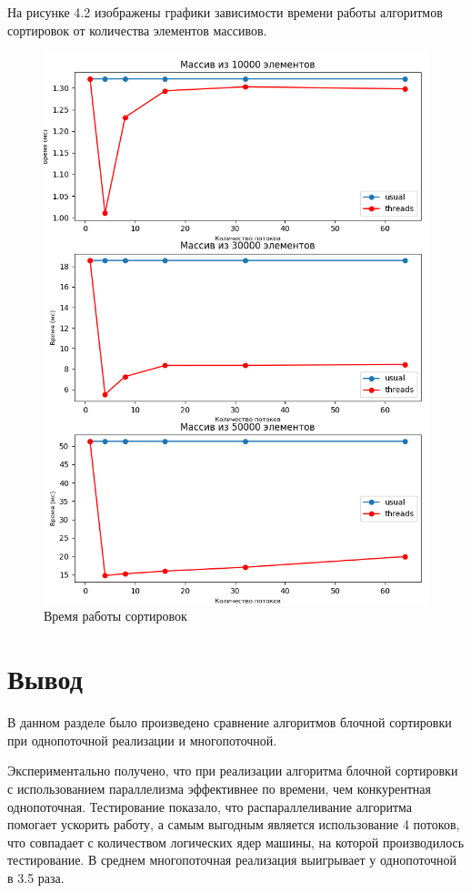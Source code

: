 На рисунке 4.2 изображены графики зависимости времени работы алгоритмов сортировок от количества элементов массивов. 

\begin{figure}[h!]
	\centering
	\includegraphics[width=1\linewidth]{img/Plot.png}
	\caption{Время работы сортировок}
	\label{fig:mpr}
\end{figure}

\section*{Вывод}
В данном разделе было произведено сравнение алгоритмов блочной сортировки при однопоточной реализации и многопоточной.

Экспериментально получено, что при реализации алгоритма блочной сортировки с использованием параллелизма эффективнее по времени, чем конкурентная однопоточная. Тестирование показало, что распараллеливание алгоритма помогает ускорить работу, а самым выгодным является использование 4 потоков, что совпадает с количеством логических ядер машины, на которой производилось тестирование. В среднем многопоточная реализация выигрывает у однопоточной в 3.5 раза. 
